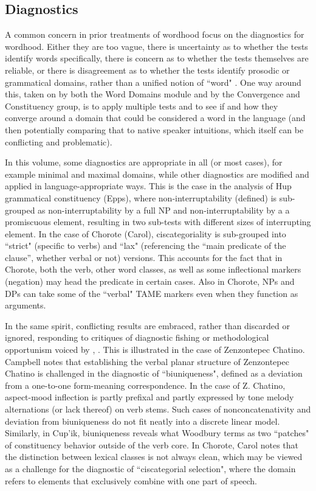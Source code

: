 \documentclass[output=paper]{langscibook}
\begin{document}
\subsection{Diagnostics}
\label{sec:diagnostics}

A common concern in prior treatments of wordhood focus on the diagnostics for wordhood. Either they are too vague, there is uncertainty as to whether the tests identify words specifically, there is concern as to whether the tests themselves are reliable, or there is disagreement as to whether the tests identify prosodic or grammatical domains, rather than a unified notion of ``word" . One way around this, taken on by both the Word Domains module and by the Convergence and Constituency group, is to apply multiple tests and to see if and how they converge around a domain that could be considered a word in the language (and then potentially comparing that to native speaker intuitions, which itself can be conflicting and problematic).

\largerpage
In this volume, some diagnostics are appropriate in all (or most cases), for example minimal and maximal domains, while other diagnostics are modified and applied in language-appropriate ways. This is the case in the analysis of Hup grammatical constituency (Epps), where non-interruptability (defined) is sub-grouped as non-interruptability by a full NP and non-interruptability by a a promiscuous element, resulting in two sub-tests with different sizes of interrupting element. 
In the case of Chorote (Carol), ciscategoriality is sub-grouped into ``strict" (specific to verbs) and ``lax" (referencing the “main predicate of the clause”, whether verbal or not) versions. This accounts for the fact that in Chorote, both the verb, other word classes, as well as some inflectional markers (negation) may head the predicate in certain cases. Also in Chorote, NPs and DPs can take some of the ``verbal" TAME markers even when they function as arguments.

In the same spirit, conflicting results are embraced, rather than discarded or ignored, responding to critiques of diagnostic fishing or methodological opportunism voiced by \citet{Croft2001}, \citet{Haspelmath2011}. This is illustrated in the case of Zenzontepec Chatino. Campbell notes that establishing the verbal planar structure of Zenzontepec Chatino is challenged in the diagnostic of ``biuniqueness", defined as a deviation from a one-to-one form-meaning correspondence. In the case of Z. Chatino, aspect-mood inflection is partly prefixal and partly expressed by tone melody alternations (or lack thereof) on verb stems. Such cases of nonconcatenativity and deviation from biuniqueness do not fit neatly into a discrete linear model. Similarly, in Cup’ik, biuniqueness reveals what Woodbury terms as two ``patches" of constituency behavior outside of the verb core. In Chorote, Carol notes that the distinction between lexical classes is not always clean, which may be viewed as a challenge for the diagnostic of ``ciscategorial selection", where the domain refers to elements that exclusively combine with one part of speech.
\end{document}
